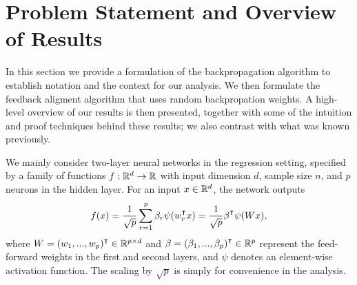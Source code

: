 \section{Problem Statement and Overview of Results}

In this section we provide a formulation of the backpropagation
algorithm to establish notation and the context for our analysis. We then
formulate the feedback aligment algorithm that uses random backpropation weights.
A high-level overview of our results is then presented, together with
some of the intuition and proof techniques behind these results; we also contrast with what was known previously.

We mainly consider two-layer neural networks in the regression setting, specified by a family of functions  $f:{\mathbb{R}^{d}} \to \mathbb{R}$ with input dimension $d$, sample size $n$, and $p$ neurons in the hidden layer. For an input $x\in{\mathbb{R}^{d}}$, the network outputs
\begin{align}\label{eqn:nonlinear-network}
    f(x) = \frac{1}{\sqrt p}\sum_{r=1}^p\beta_r\psi(w_r\transpose x)= \frac{1}{\sqrt p}\beta\transpose\psi(Wx),
\end{align}
where $W = (w_1,...,w_p)\transpose\in\Rpd$ and $\beta = (\beta_1,...,\beta_p)\transpose\in\Rp$ represent the feed-forward weights in the first and second layers, and $\psi$ denotes an element-wise activation function. The scaling by $\sqrt{p}$ is simply for convenience in the analysis.


